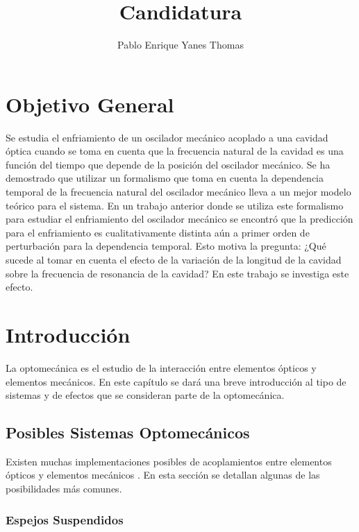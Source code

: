 \documentclass[10pt,a4paper]{report}
\author{Pablo Enrique Yanes Thomas}
\title{Candidatura}
\begin{document}
\tableofcontents
\chapter*{Objetivo General}

Se estudia el enfriamiento de un oscilador mecánico acoplado a una
cavidad óptica cuando se toma en cuenta que la frecuencia natural de
la cavidad es una función del tiempo que depende de la posición del
oscilador mecánico. Se ha demostrado que utilizar un formalismo que
toma en cuenta la dependencia temporal de la frecuencia natural del
oscilador mecánico lleva a un mejor modelo teórico para el
sistema\cite{HanngiFM}. En un trabajo anterior donde se utiliza este
formalismo para estudiar el enfriamiento del oscilador mecánico se
encontró que la predicción para el enfriamiento es cualitativamente
distinta aún a primer orden de perturbación para la dependencia
temporal\cite{YanesOC}. Esto motiva la pregunta: ¿Qué sucede al tomar
en cuenta el efecto de la variación de la longitud de la cavidad sobre
la frecuencia de resonancia de la cavidad? En este trabajo se
investiga este efecto.


\chapter{Introducción}

La optomecánica es el estudio de la interacción entre elementos ópticos y elementos mecánicos. En este capítulo se dará una breve introducción al tipo de sistemas y de efectos que se consideran parte de la optomecánica. 


\section{Posibles Sistemas Optomecánicos}

Existen muchas implementaciones posibles de acoplamientos entre elementos ópticos y elementos mecánicos \cite{KippenberCO}. En esta sección se detallan algunas de las posibilidades más comunes.

\subsection{Espejos Suspendidos}
\end{document}
